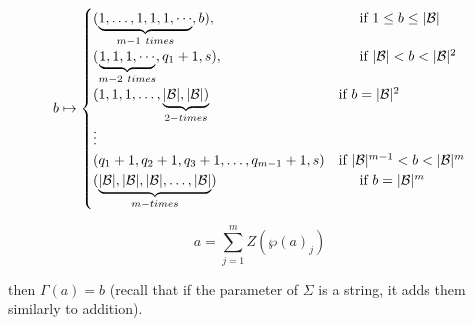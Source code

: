 \documentclass[amsmath,12pt,a4paper]{amsart}
\begin{document}
\begin{equation}
b \mapsto
\begin{cases}
(\underbrace{1, \ldots, 1, 1, 1,\cdots}_{m-1~ times} , b), &\indent \text{if  $1 \leq b \leq |\mathcal{B}| $}\\
(\underbrace{1,1, 1,\cdots}_{m-2 ~times}, q_1 + 1, s), & \indent\text{if $ |\mathcal{B}| < b < |\mathcal{B}|^2$} \\
(1, 1, 1, \ldots, \underbrace{|\mathcal{B}|, |\mathcal{B}|)}_{2-times} & \text{if } b = |\mathcal{B}|^2 \\
\vdots \\
(q_1 + 1, q_2 + 1, q_3 + 1, \ldots, q_{m-1} + 1, s) & \text{if } |\mathcal{B}|^{m-1} < b < |\mathcal{B}|^m \\
(\underbrace{|\mathcal{B}|, |\mathcal{B}|, |\mathcal{B}|, \ldots, |\mathcal{B}|}_{m-times} ) & \indent \text{if $b = |\mathcal{B}|^m$}
\end{cases}
\end{equation}

$$
a = \sum_{j=1}^m Z(\wp(a)_j)
$$

then $\Gamma(a) = b$ (recall that if the parameter of \(\Sigma\) is a string, it adds them similarly to addition).
\end{document}
